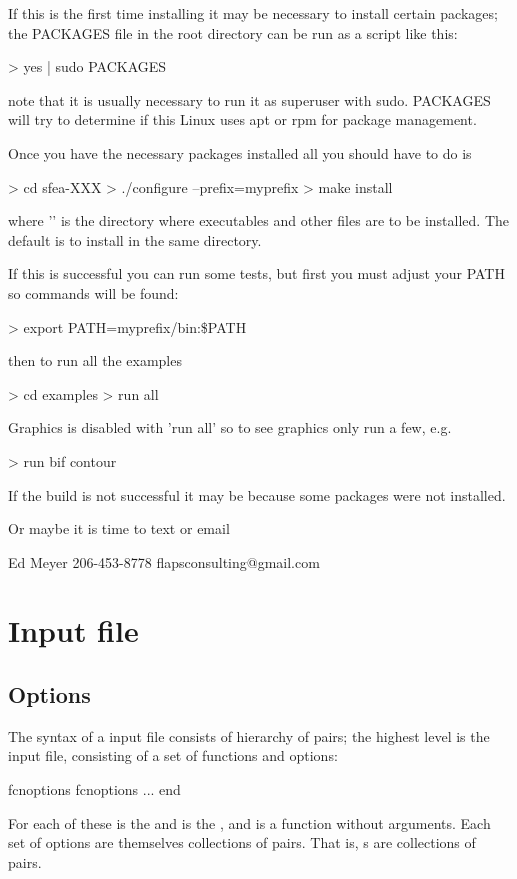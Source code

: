 If this is the first time installing \Flaps it may be necessary to
install certain packages; the PACKAGES file in the \Flaps root directory
can be run as a script like this:
\begin{example}
> yes | sudo PACKAGES
\end{example}
note that it is usually necessary to run it as superuser with sudo.
PACKAGES will try to determine if this Linux uses apt or rpm for
package management.

Once you have the necessary packages installed all you should have
to do is
\begin{example}
>  cd sfea-XXX
>  ./configure --prefix=myprefix
>  make install
\end{example}
where '' is the directory where executables and
other files are to be installed. The default is to install in
the same directory.

If this is successful you can run some tests, but first you must
adjust your PATH so commands will be found:
\begin{example}
> export PATH=myprefix/bin:\$PATH
\end{example}

then to run all the examples
\begin{example}
>  cd examples
>  run all
\end{example}
Graphics is disabled with 'run all' so to see graphics only
run a few, e.g.
\begin{example}
>  run bif contour
\end{example}

If the build is not successful it may be because some packages
were not installed.

Or maybe it is time to text or email
\begin{example}
Ed Meyer
206-453-8778
flapsconsulting@gmail.com
\end{example}

\newpage
\section{Input file}\label{sect:input-file}

\subsection{Options}\label{syntax}
The syntax of a \flaps input file consists of hierarchy of
 pairs; the highest level is the input file,
consisting of a set of \flaps functions and options:
\begin{example}
   fcn{options}
   fcn{options}
	  ...
   end
\end{example}
For each of these  is the  and 
is the , and  is a function without arguments.
Each set of options are themselves collections of 
pairs. That is, s are collections of
 pairs.


